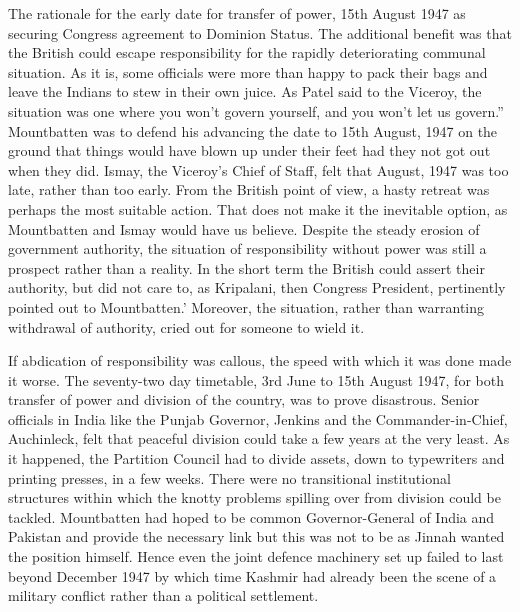 \begin{multicols}{2}
The rationale for the early date for transfer of power, 15th August 1947 as securing Congress agreement to Dominion Status. The additional benefit was that the British could escape responsibility for the rapidly deteriorating communal situation. As it is, some officials were more than happy to pack their bags and leave the Indians to stew in their own juice. As Patel said to the Viceroy, the situation was one where you won't govern yourself, and you won't let us govern.'' Mountbatten was to defend his advancing the date to 15th August, 1947 on the ground that things would have blown up under their feet had they not got out when they did. Ismay, the Viceroy's Chief of Staff, felt that August, 1947 was too late, rather than too early. From the British point of view, a hasty retreat was perhaps the most suitable action. That does not make it the inevitable option, as Mountbatten and Ismay would have us believe. Despite the steady erosion of government authority, the situation of responsibility without power was still a prospect rather than a reality. In the short term the British could assert their authority, but did not care to, as Kripalani, then Congress President, pertinently pointed out to Mountbatten.' Moreover, the situation, rather than warranting withdrawal of authority, cried out for someone to wield it. 

If abdication of responsibility was callous, the speed with which it was done made it worse. The seventy-two day timetable, 3rd June to 15th August 1947, for both transfer of power and division of the country, was to prove disastrous. Senior officials in India like the Punjab Governor, Jenkins and the Commander-in-Chief, Auchinleck, felt that peaceful division could take a few years at the very least. As it happened, the Partition Council had to divide assets, down to typewriters and printing presses, in a few weeks. There were no transitional institutional structures within which the knotty problems spilling over from division could be tackled. Mountbatten had hoped to be common Governor-General of India and Pakistan and provide the necessary link but this was not to be as Jinnah wanted the position himself. Hence even the joint defence machinery set up failed to last beyond December 1947 by which time Kashmir had already been the scene of a military conflict rather than a political settlement. 


\end{multicols}
